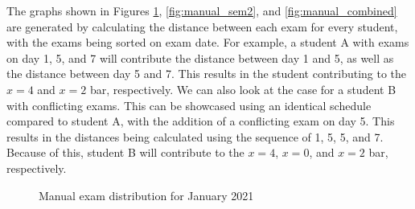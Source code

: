 The graphs shown in Figures \ref{fig:manual_sem1}, \ref{fig:manual_sem2}, and \ref{fig:manual_combined} are generated by calculating the distance between each exam for every student, with the exams being sorted on exam date. For example, a student A with exams on day 1, 5, and 7 will contribute the distance between day 1 and 5, as well as the distance between day 5 and 7. This results in the student contributing to the $x = 4$ and $x = 2$ bar, respectively. We can also look at the case for a student B with conflicting exams. This can be showcased using an identical schedule compared to student A, with the addition of a conflicting exam on day 5. This results in the distances being calculated using the sequence of 1, 5, 5, and 7. Because of this, student B will contribute to the $x = 4$, $x = 0$, and $x = 2$ bar, respectively.

\begin{figure}[H]
  \centering
  \hfill
  \caption{Manual exam distribution for January 2021}
  \label{fig:manual_sem1}
\end{figure}

